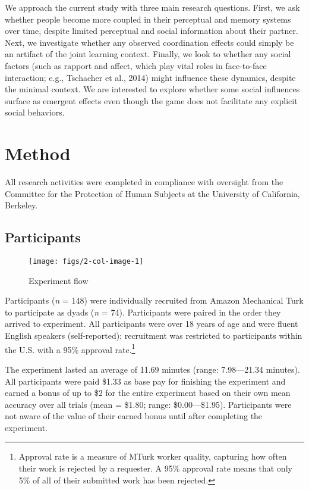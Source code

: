 \documentclass[10pt, letterpaper]{article}
\newenvironment{CodeChunk}{}{}
\begin{document}
We approach the current study with three main research questions. First,
we ask whether people become more coupled in their perceptual and memory
systems over time, despite limited perceptual and social information
about their partner. Next, we investigate whether any observed
coordination effects could simply be an artifact of the joint learning
context. Finally, we look to whether any social factors (such as rapport
and affect, which play vital roles in face-to-face interaction; e.g.,
Tschacher et al., 2014) might influence these dynamics, despite the
minimal context. We are interested to explore whether some social
influences surface as emergent effects even though the game does not
facilitate any explicit social behaviors.

\section{Method}\label{method}

All research activities were completed in compliance with oversight from
the Committee for the Protection of Human Subjects at the University of
California, Berkeley.

\subsection{Participants}\label{participants}

\begin{CodeChunk}
\begin{figure*}[h]

{\centering \texttt{[image: figs/2-col-image-1]}

}

\caption[Experiment flow]{Experiment flow}\label{fig:2-col-image}
\end{figure*}
\end{CodeChunk}

Participants (\emph{n} = 148) were individually recruited from Amazon
Mechanical Turk to participate as dyads (\emph{n} = 74). Participants
were paired in the order they arrived to experiment. All participants
were over 18 years of age and were fluent English speakers
(self-reported); recruitment was restricted to participants within the
U.S. with a 95\% approval
rate.\footnote{Approval rate is a measure of MTurk worker quality, capturing how often their work is rejected by a requester. A 95\% approval rate means that only 5\% of all of their submitted work has been rejected.}

The experiment lasted an average of 11.69 minutes (range: 7.98---21.34
minutes). All participants were paid \$1.33 as base pay for finishing
the experiment and earned a bonus of up to \$2 for the entire experiment
based on their own mean accuracy over all trials (mean = \$1.80; range:
\$0.00---\$1.95). Participants were not aware of the value of their
earned bonus until after completing the experiment.
\end{document}
